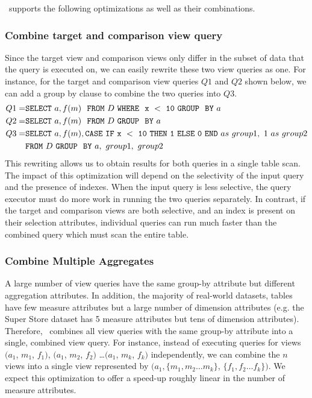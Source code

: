 \SeeDB\ supports the following
optimizations as well as their combinations.





\subsubsection{Combine target and comparison view query}
\label{subsec:target_comparison_view}
Since the target view and comparison views only differ in the subset of data
that the query is executed on, we can easily rewrite these two view queries as
one. For instance, for the target and comparison view queries $Q1$ and $Q2$
shown below, we can add a group by clause to combine the two queries into $Q3$.
\begin{align*} 
Q1 = &{\tt SELECT \ } a, f(m) \ \ {\tt FROM} \  D\  {\tt WHERE \ \ x\ <\ 10\
GROUP \ \ BY} \ a \\
Q2 = &{\tt SELECT \ } a, f(m) \ \ {\tt FROM} \  D\  {\tt GROUP \ \ BY} \ a \\
Q3 = &{\tt SELECT \ } a, f(m), {\tt CASE\ IF\ x\ <\ 10\ THEN\ 1\ ELSE\ 0\
END}\ as\ group1,\ 1\ as\ group2\\ 
&{\tt FROM} \ D\ {\tt GROUP \ \ BY} \ a,\ group1,\ group2
\end{align*}
This rewriting allows us to obtain results for both queries in a single table
scan. The impact of this optimization will depend on the selectivity of the
input query and the presence of indexes. When the input query is less selective,
the query executor must do more work in running the two queries separately.
In contrast, if the target and comparison views are both selective, and an index
is present on their selection attributes, individual queries can run much
faster than the combined query which must scan the entire table.
\mpv{Effect of indexes?}  


\subsubsection {Combine Multiple Aggregates} 
A large number of view queries have the same group-by attribute but different
aggregation attributes. In addition, the majority of real-world datasets,
tables have few measure attributes but a large number of dimension attributes
(e.g. the Super Store dataset has 5 measure attributes but tens of dimension
attributes). Therefore, \SeeDB\ combines all view queries with the same group-by
attribute into a single, combined view query. For instance, instead of executing
queries for views $(a_1$, $m_1$, $f_1)$, $(a_1$, $m_2$, $f_2)$ \ldots $(a_1$, $m_k$, $f_k)$
independently, we can combine the $n$ views into a single view represented by
$(a_1, \{m_1, m_2\ldots m_k\}$, $\{f_1, f_2\ldots f_k\})$. We expect this
optimization to offer a speed-up roughly linear in the number of measure
attributes.

